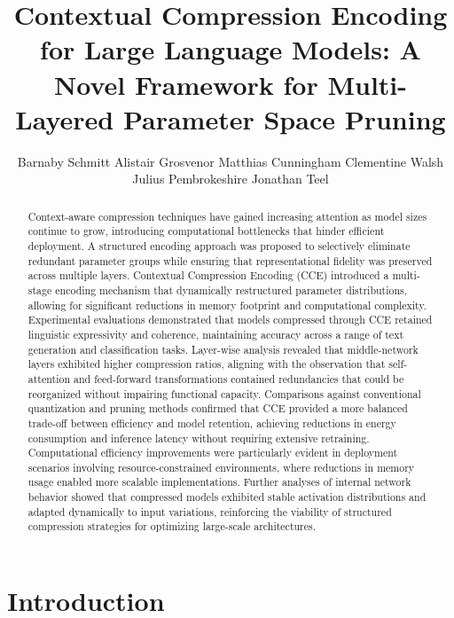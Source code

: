 \documentclass{article}
\title{Contextual Compression Encoding for Large Language Models: A Novel Framework for Multi-Layered Parameter Space Pruning}
\author{Barnaby Schmitt \And Alistair Grosvenor \And Matthias Cunningham \And  Clementine Walsh \And  Julius Pembrokeshire \And Jonathan Teel}
\begin{document}
\maketitle


\begin{abstract}
Context-aware compression techniques have gained increasing attention as model sizes continue to grow, introducing computational bottlenecks that hinder efficient deployment. A structured encoding approach was proposed to selectively eliminate redundant parameter groups while ensuring that representational fidelity was preserved across multiple layers. Contextual Compression Encoding (CCE) introduced a multi-stage encoding mechanism that dynamically restructured parameter distributions, allowing for significant reductions in memory footprint and computational complexity. Experimental evaluations demonstrated that models compressed through CCE retained linguistic expressivity and coherence, maintaining accuracy across a range of text generation and classification tasks. Layer-wise analysis revealed that middle-network layers exhibited higher compression ratios, aligning with the observation that self-attention and feed-forward transformations contained redundancies that could be reorganized without impairing functional capacity. Comparisons against conventional quantization and pruning methods confirmed that CCE provided a more balanced trade-off between efficiency and model retention, achieving reductions in energy consumption and inference latency without requiring extensive retraining. Computational efficiency improvements were particularly evident in deployment scenarios involving resource-constrained environments, where reductions in memory usage enabled more scalable implementations. Further analyses of internal network behavior showed that compressed models exhibited stable activation distributions and adapted dynamically to input variations, reinforcing the viability of structured compression strategies for optimizing large-scale architectures.


\end{abstract}





\section{Introduction}
\end{document}

